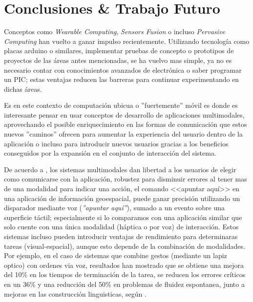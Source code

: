 
\chapter{Conclusiones \& Trabajo Futuro} %

\label{ch:end_future} %
Conceptos como \emph{Wearable Computing}, \emph{Sensors Fusion} o incluso \emph{Pervasive Computing} han vuelto a ganar impulso recientemente. Utilizando tecnología como placas arduino o similares, implementar pruebas de concepto o prototipos de proyectos de las áreas antes mencionadas, se ha vuelvo mas simple, ya no es necesario contar con conocimientos avanzados de electrónica o saber programar un PIC; estas ventajas reducen las barreras para continuar experimentando en dichas áreas.

Es en este contexto de computación ubicua o ''fuertemente'' móvil es donde es interesante pensar en usar conceptos de desarrollo de aplicaciones multimodales, aprovechando el posible enriquecimiento en las formas de comunicación que estos nuevos ''caminos'' ofrecen para aumentar la experiencia del usuario dentro de la aplicación o incluso para introducir nuevos usuarios gracias a los beneficios conseguidos por la expansión en el conjunto de interacción del sistema.

De acuerdo a \citet{kortum2008hci}, los sistemas multimodales dan libertad a los usuarios de elegir como comunicarse con la aplicación, robustez para disminuir errores al tener mas de una modalidad para indicar una acción, \eg el comando <<apuntar aquí>> en una aplicación de información geoespacial, puede ganar precisión utilizando un disparador mediante voz (\emph{''apuntar aquí''}), sumado a un evento sobre una superficie táctil; especialmente si lo comparamos con una aplicación similar que solo cuente con una única modalidad (háptica o por voz) de interacción. Estos sistemas incluso pueden introducir ventajas de rendimiento para determinaras tareas (\eg  visual-espacial), aunque esto depende de la combinación de modalidades. Por ejemplo, en el caso de sistemas que combine gestos (mediante un lapiz optico) con ordenes via voz, resultados han mostrado que se obtiene una mejora del 10\% en los tiempos de terminación de la tarea, se reducen los errores críticos en un 36\% y una reducción del 50\% en problemas de fluidez espontanea, junto a mejoras en las construcción linguisticas, según \citet{oviatt1998referential}.


